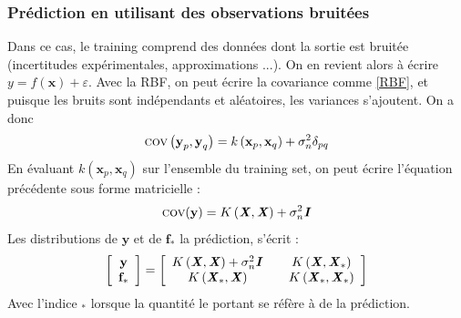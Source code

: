 \documentclass[a4paper,12pt]{report}
\newcommand{\bepar}[1]{
	\left( #1 \right)  
}
\numberwithin{equation}{section} %
\begin{document}
\subsubsection*{Prédiction en utilisant des observations bruitées}
Dans ce cas, le training comprend des données dont la sortie est bruitée (incertitudes expérimentales, approximations ...). On en revient alors à écrire $y = f(\textbf{x}) + \varepsilon$. Avec la RBF, on peut écrire la covariance comme \eqref{RBF}, et puisque les bruits sont indépendants et aléatoires, les variances s'ajoutent. On a donc 
\begin{equation*}
\textsc{cov}\bepar{\textbf{y}_p, \textbf{y}_q} = k\bepar{\textbf{x}_p, \textbf{x}_q} + \sigma_n^2 \delta_{pq}
\end{equation*}
En évaluant $k\bepar{\textbf{x}_p, \textbf{x}_q}$ sur l'ensemble du training set, on peut écrire l'équation précédente sous forme matricielle :
\begin{equation}
\textsc{cov}(\textbf{y}) = K\bepar{\textbf{\textit{X}}, \textbf{\textit{X}}} + \sigma_n^2\textbf{\textit{I}}
\end{equation}
Les distributions de $\textbf{y}$ et de $\textbf{f}_*$ la prédiction, s'écrit :
\begin{equation}
\left[ \begin{array}{c} 
 \textbf{y} \\ \textbf{f}_* \end{array}
\right] = \left[\begin{array}{c@{\qquad}c} K\left(\textbf{\textit{X}}, \textbf{\textit{X}}\right) + \sigma_n^2\textbf{\textit{I}}& K\bepar{\textbf{\textit{X}}, \textbf{\textit{X}}_*}\\ K\bepar{\textbf{\textit{X}}_*, \textbf{\textit{X}}} & K\bepar{\textbf{\textit{X}}_*, \textbf{\textit{X}}_*}\\  \end{array}\right] \label{GP_matrix_form}
\end{equation}
Avec l'indice $_*$ lorsque la quantité le portant se réfère à de la prédiction.\\
\end{document}
